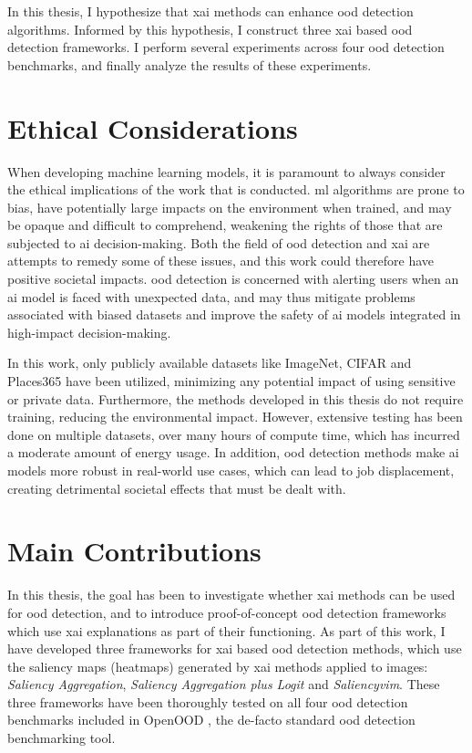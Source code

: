 \documentclass[UKenglish]{uiomasterthesis} %
\theoremstyle{definition}
\begin{document}
In this thesis, I hypothesize that \ac{xai} methods can enhance \ac{ood} detection algorithms. Informed by this hypothesis, I construct three \ac{xai} based \ac{ood} detection frameworks. I perform several experiments across four \ac{ood} detection benchmarks, and finally analyze the results of these experiments.

\section{Ethical Considerations}

When developing machine learning models, it is paramount to always consider the ethical implications of the work that is conducted. \ac{ml} algorithms are prone to bias, have potentially large impacts on the environment when trained, and may be opaque and difficult to comprehend, weakening the rights of those that are subjected to \ac{ai} decision-making. Both the field of \ac{ood} detection and \ac{xai} are attempts to remedy some of these issues, and this work could therefore have positive societal impacts. \ac{ood} detection is concerned with alerting users when an \ac{ai} model is faced with unexpected data, and may thus mitigate problems associated with biased datasets and improve the safety of \ac{ai} models integrated in high-impact decision-making. 

In this work, only publicly available datasets like ImageNet, CIFAR and Places365 have been utilized, minimizing any potential impact of using sensitive or private data. Furthermore, the methods developed in this thesis do not require training, reducing the environmental impact. However, extensive testing has been done on multiple datasets, over many hours of compute time, which has incurred a moderate amount of energy usage. In addition, \ac{ood} detection methods make \ac{ai} models more robust in real-world use cases, which can lead to job displacement, creating detrimental societal effects that must be dealt with.

\section{Main Contributions}

In this thesis, the goal has been to investigate whether \ac{xai} methods can be used for \ac{ood} detection, and to introduce proof-of-concept \ac{ood} detection frameworks which use \ac{xai} explanations as part of their functioning. As part of this work, I have developed three frameworks for \ac{xai} based \ac{ood} detection methods, which use the saliency maps (heatmaps) generated by \ac{xai} methods applied to images: {\it Saliency Aggregation}, {\it Saliency Aggregation plus Logit} and {\it Saliency\acs*{vim}}. These three frameworks have been thoroughly tested on all four \ac{ood} detection benchmarks included in OpenOOD \cite{openood, openood15}, the de-facto standard \ac{ood} detection benchmarking tool.
\end{document}
